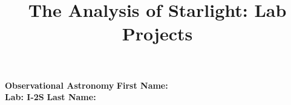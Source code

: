 \documentclass[12pt]{article}
\title{The Analysis of Starlight: Lab Projects}
\begin{document}
\setcounter{page}{1}
\setcounter{equation}{0}
\pagestyle{plain}
\thispagestyle{empty}  %
\newcommand{\kms}{\hbox{km\,s$^{\rm -1}$}}
\def\lo {\ifmmode {\,{\it L}\solar} \else $\,L$\solar\fi}       %
\def\my {\ifmmode {\,{\it M}\solar\,{\rm yr^{-1}}}              %
        \else {$\,M$\solar$\,$yr$^{\rm -1}$}\fi}
\def\BD {BD$\,$+30{\degr}3639}
\def\HUNO{\rm H$\,$I}                   %
\def\HDOS{\rm H$_2$}                    %
\def\arcsec{\ifmmode {^{\scriptscriptstyle\prime\prime}}
          \else $^{\scriptscriptstyle\prime\prime}$\fi}
\def\arcminm{\ifmmode {^{\scriptscriptstyle\prime}}
          \else $^{\scriptscriptstyle\prime}$\fi}
\def\deg{\ifmmode^\circ\else$^\circ$\fi}




\noindent
{\bf Observational Astronomy    \hfill} {\bf First Name:\makebox[4cm]{\hrulefill}}\\
{\bf Lab: I-2S} \hfill {\bf Last Name:\makebox[4cm]{\hrulefill}}


\bigskip

\medskip


\end{document}
